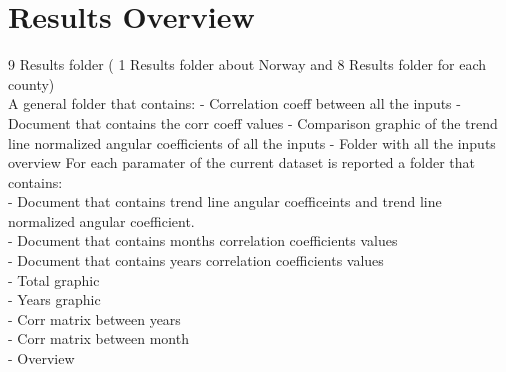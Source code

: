 \chapter{Results Overview}

9 Results folder ( 1 Results folder about Norway and 8 Results folder for each county) \\
	A general folder that contains:
		- Correlation coeff between all the inputs
		- Document that contains the corr coeff values
		- Comparison graphic of the trend line normalized angular coefficients of all the inputs
		- Folder with all the inputs overview
	For each paramater of the current dataset is reported a folder that contains:\\
		- Document that contains trend line angular coefficeints and trend line normalized angular coefficient.\\	
		- Document that contains months correlation coefficients values\\
		- Document that contains years correlation coefficients values\\
		- Total graphic\\
		- Years graphic\\
		- Corr matrix between years\\
		- Corr matrix between month\\
		- Overview \\